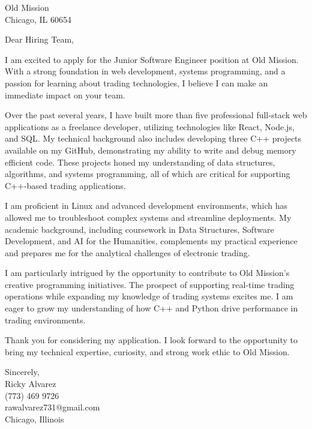 \documentclass[a4paper,10pt]{letter}
\begin{document}
\begin{letter}{Old Mission \\
Chicago, IL 60654}

\opening{Dear Hiring Team,}

I am excited to apply for the Junior Software Engineer position at Old Mission. With a strong foundation in web development, systems programming, and a passion for learning about trading technologies, I believe I can make an immediate impact on your team.

Over the past several years, I have built more than five professional full-stack web applications as a freelance developer, utilizing technologies like React, Node.js, and SQL. My technical background also includes developing three C++ projects available on my GitHub, demonstrating my ability to write and debug memory efficient code. These projects honed my understanding of data structures, algorithms, and systems programming, all of which are critical for supporting C++-based trading applications.

I am proficient in Linux and advanced development environments, which has allowed me to troubleshoot complex systems and streamline deployments. My academic background, including coursework in Data Structures, Software Development, and AI for the Humanities, complements my practical experience and prepares me for the analytical challenges of electronic trading.

I am particularly intrigued by the opportunity to contribute to Old Mission’s creative programming initiatives. The prospect of supporting real-time trading operations while expanding my knowledge of trading systems excites me. I am eager to grow my understanding of how C++ and Python drive performance in trading environments.

Thank you for considering my application. I look forward to the opportunity to bring my technical expertise, curiosity, and strong work ethic to Old Mission.

\vspace{1em}

Sincerely, \\ 
Ricky Alvarez \\
(773) 469 9726 \\
rawalvarez731@gmail.com \\
Chicago, Illinois

\end{letter}
\end{document}
